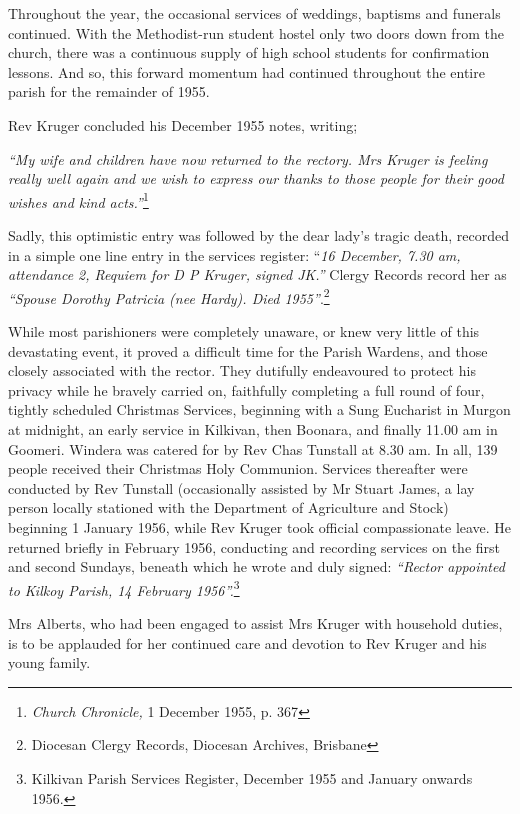 Throughout the year, the occasional services of weddings, baptisms and funerals continued. With the Methodist-run student hostel only two doors down from the church, there was a continuous supply of high school students for confirmation lessons. And so, this forward momentum had continued throughout the entire parish for the remainder of 1955.



Rev Kruger concluded his December 1955 notes, writing;



\emph{``My wife and children have now returned to the rectory. Mrs Kruger is feeling really well again and we wish to express our thanks to those people for their good wishes and kind acts.''}\footnote{\emph{Church Chronicle,} 1 December 1955, p. 367}


\smallskip


Sadly, this optimistic entry was followed by the dear lady's tragic death, recorded in a simple one line entry in the services register: ``\emph{16 December, 7.30 am, attendance 2, Requiem for D P Kruger, signed JK.''} Clergy Records record her as \emph{``Spouse Dorothy Patricia (nee Hardy). Died 1955''}.\footnote{Diocesan Clergy Records, Diocesan Archives, Brisbane}


\smallskip


While most parishioners were completely unaware, or knew very little of this devastating event, it proved a difficult time for the Parish Wardens, and those closely associated with the rector. They dutifully endeavoured to protect his privacy while he bravely carried on, faithfully completing a full round of four, tightly scheduled Christmas Services, beginning with a Sung Eucharist in Murgon at midnight, an early service in Kilkivan, then Boonara, and finally 11.00 am in Goomeri. Windera was catered for by Rev Chas Tunstall at 8.30 am. In all, 139 people received their Christmas Holy Communion. Services thereafter were conducted by Rev Tunstall (occasionally assisted by Mr Stuart James, a lay person locally stationed with the Department of Agriculture and Stock) beginning 1 January 1956, while Rev Kruger took official compassionate leave. He returned briefly in February 1956, conducting and recording services on the first and second Sundays, beneath which he wrote and duly signed: \emph{``Rector appointed to Kilkoy Parish, 14 February 1956''.}\footnote{Kilkivan Parish Services Register, December 1955 and January onwards 1956.}


Mrs Alberts, who had been engaged to assist Mrs Kruger with household duties, is to be applauded for her continued care and devotion to Rev Kruger and his young family.



